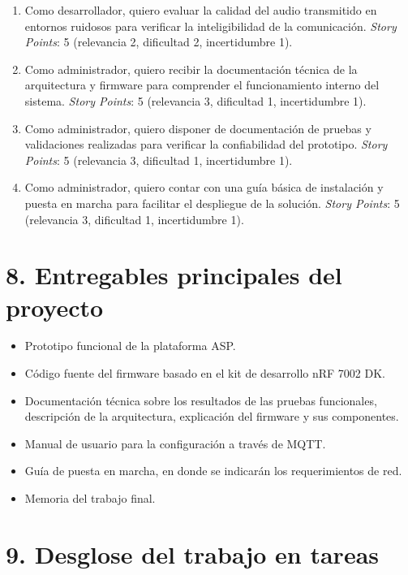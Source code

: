 \documentclass[
11pt, %
]{charter}
\newcommand{\storyPoints}{\textit{Story Points}}
\begin{document}
\begin{enumerate}
\begin{enumerate}
			\item Como desarrollador, quiero evaluar la calidad del audio transmitido en entornos ruidosos para verificar la inteligibilidad de la comunicación. \storyPoints{}: 5 (relevancia 2, dificultad 2, incertidumbre 1).
			
			\item Como administrador, quiero recibir la documentación técnica de la arquitectura y firmware para comprender el funcionamiento interno del sistema. \storyPoints{}: 5 (relevancia 3, dificultad 1, incertidumbre 1).
			
			\item Como administrador, quiero disponer de documentación de pruebas y validaciones realizadas para verificar la confiabilidad del prototipo. \storyPoints{}: 5 (relevancia 3, dificultad 1, incertidumbre 1).
			
			\item Como administrador, quiero contar con una guía básica de instalación y puesta en marcha para facilitar el despliegue de la solución. \storyPoints{}: 5 (relevancia 3, dificultad 1, incertidumbre 1).
			
		\end{enumerate}

\end{enumerate}


\section{8. Entregables principales del proyecto}
\label{sec:entregables}

\begin{itemize}
	\item Prototipo funcional de la plataforma ASP.
	\item Código fuente del firmware basado en el kit de desarrollo nRF 7002 DK.
	\item Documentación técnica sobre los resultados de las pruebas funcionales, descripción de la arquitectura, explicación del firmware y sus componentes.
	\item Manual de usuario para la configuración a través de MQTT.
	\item Guía de puesta en marcha, en donde se indicarán los requerimientos de red.
	\item Memoria del trabajo final.
\end{itemize}


\section{9. Desglose del trabajo en tareas}
\label{sec:wbs}
\end{document}
